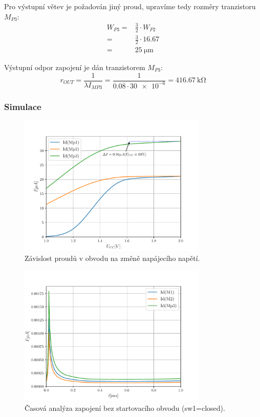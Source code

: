 Pro výstupní větev je požadován jiný proud, upravíme tedy rozměry tranzistoru \(M_{P3} \):
\begin{align*}
    W_{P3} =& \frac{3}{2}\cdot W_{P2} \\
           =& \frac{3}{2}\cdot \num{16.67} \\
           =& \qty{25}{\micro\meter}
\end{align*}

Výstupní odpor zapojení je dán tranzistorem \(M_{P3} \):
\[
    r_{OUT} = \frac{1}{\lambda I_{MP3} }=\frac{1}{\num{0.08}\cdot \num{30e-6}}=\qty{416.67}{\kilo\ohm}
\]

\subsubsection{Simulace}

\begin{figure}[h!]
    \centering
    \includegraphics[width=0.8\textwidth]{img/3-1-4.pdf}
    \caption{Závislost proudů v obvodu na změně napájecího napětí.}
    \label{fig:img/3-1-4.pdf}
\end{figure}


\begin{figure}[h!]
    \centering
    \includegraphics[width=0.8\textwidth]{img/3-1-5.pdf}
    \caption{Časová analýza zapojení bez startovacího obvodu (sw1=closed).}
    \label{fig:img/3-1-5.pdf}
\end{figure}

